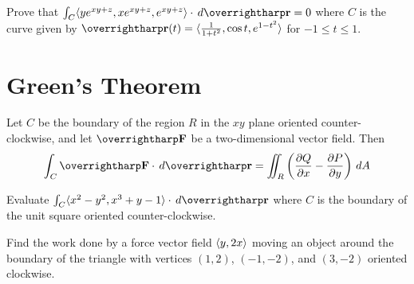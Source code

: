 \documentclass[letterpaper, twoside, 12pt]{book}
\begin{document}
          \begin{problem}
            Prove that
            $\int_C\<ye^{xy+z},xe^{xy+z},e^{xy+z}\>\cdot\dvar{\vect r}=0$
            where $C$ is the curve given by
            $\vect{r}(t)=\<\frac{1}{1+t^2},\cos t,e^{1-t^2}\>$
            for $-1 \leq t \leq 1$.
          \end{problem}

          \begin{solution}

          \end{solution}

          \begin{contributors}

          \end{contributors}


\section{Green's Theorem} %

\begin{theorem}
  Let $C$ be the boundary of the region $R$ in the $xy$ plane oriented
  counter-clockwise, and let $\vect{F}$ be a two-dimensional vector field. Then
  \[
    \int_C \vect{F}\cdot\dvar{\vect{r}}
      =
    \iint_R \left(\frac{\p Q}{\p x}-\frac{\p P}{\p y}\right)\dvar{A}
  \]
\end{theorem}

          \begin{problem}
            Evaluate $\int_C\<x^2-y^2,x^3+y-1\>\cdot\dvar{\vect r}$ where
            $C$ is the boundary of the unit square oriented counter-clockwise.
          \end{problem}

          \begin{solution}

          \end{solution}

          \begin{contributors}

          \end{contributors}

          \begin{problem}
            Find the work done by a force vector field $\langle y,2x\rangle$ moving an
            object around the
            boundary of the triangle with vertices $(1,2)$, $(-1,-2)$, and
            $(3,-2)$ oriented clockwise.
          \end{problem}

          \begin{solution}

          \end{solution}

          \begin{contributors}

          \end{contributors}
\end{document}
